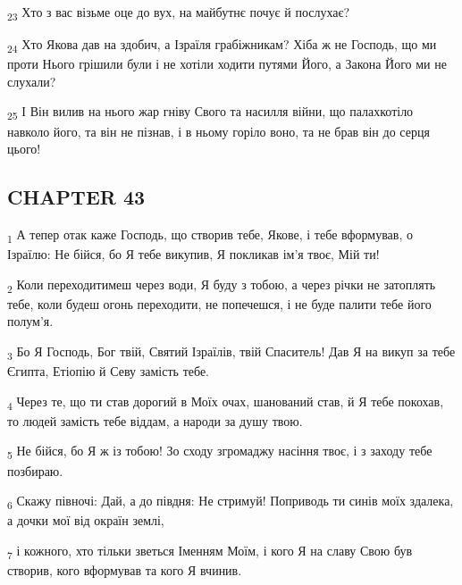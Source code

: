 \begin{tcolorbox}
\textsubscript{23} Хто з вас візьме оце до вух, на майбутнє почує й послухає?
\end{tcolorbox}
\begin{tcolorbox}
\textsubscript{24} Хто Якова дав на здобич, а Ізраїля грабіжникам? Хіба ж не Господь, що ми проти Нього грішили були і не хотіли ходити путями Його, а Закона Його ми не слухали?
\end{tcolorbox}
\begin{tcolorbox}
\textsubscript{25} І Він вилив на нього жар гніву Свого та насилля війни, що палахкотіло навколо його, та він не пізнав, і в ньому горіло воно, та не брав він до серця цього!
\end{tcolorbox}
\subsection{CHAPTER 43}
\begin{tcolorbox}
\textsubscript{1} А тепер отак каже Господь, що створив тебе, Якове, і тебе вформував, о Ізраїлю: Не бійся, бо Я тебе викупив, Я покликав ім'я твоє, Мій ти!
\end{tcolorbox}
\begin{tcolorbox}
\textsubscript{2} Коли переходитимеш через води, Я буду з тобою, а через річки не затоплять тебе, коли будеш огонь переходити, не попечешся, і не буде палити тебе його полум'я.
\end{tcolorbox}
\begin{tcolorbox}
\textsubscript{3} Бо Я Господь, Бог твій, Святий Ізраїлів, твій Спаситель! Дав Я на викуп за тебе Єгипта, Етіопію й Севу замість тебе.
\end{tcolorbox}
\begin{tcolorbox}
\textsubscript{4} Через те, що ти став дорогий в Моїх очах, шанований став, й Я тебе покохав, то людей замість тебе віддам, а народи за душу твою.
\end{tcolorbox}
\begin{tcolorbox}
\textsubscript{5} Не бійся, бо Я ж із тобою! Зо сходу згромаджу насіння твоє, і з заходу тебе позбираю.
\end{tcolorbox}
\begin{tcolorbox}
\textsubscript{6} Скажу півночі: Дай, а до півдня: Не стримуй! Поприводь ти синів моїх здалека, а дочки мої від окраїн землі,
\end{tcolorbox}
\begin{tcolorbox}
\textsubscript{7} і кожного, хто тільки зветься Іменням Моїм, і кого Я на славу Свою був створив, кого вформував та кого Я вчинив.
\end{tcolorbox}
